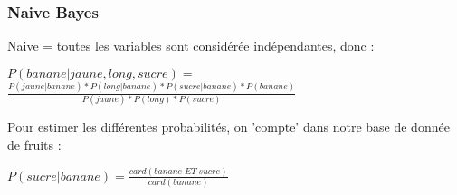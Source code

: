 \documentclass{formation}
\begin{document}
\begin{frame}
  \frametitle{Naive Bayes}
  Naive = toutes les variables sont considérée indépendantes, donc : \\
  \begin{center}
    $P(banane | jaune,long,sucre) =$\\
    $\;$\\
    $ \frac{P(jaune|banane)*P(long|banane)*P(sucre|banane)*P(banane)}{P(jaune)*P(long)*P(sucre)}$
  \end{center}
  Pour estimer les différentes probabilités, on 'compte' dans notre base de donnée de fruits :\\
  \begin{center}
    $P(sucre|banane) = \frac{card(banane\;ET\;sucre)}{card(banane)}$
  \end{center}
\end{frame}
\end{document}
